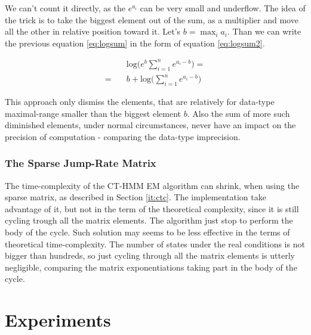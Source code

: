 \documentclass[thesis=M,english]{FITthesis}[2012/10/20]
\begin{document}
We can't count it directly, as the $e^{a_i}$ can be very small and underflow. The idea of the trick is to take the biggest element out of the sum, as a multiplier and move all the other in relative position toward it.
Let's $b = \max_{i} a_i$. Than we can write the previous equation \eqref{eq:logsum} in the form of equation \eqref{eq:logsum2}. 

\begin{equation}\label{eq:logsum2}
\begin{aligned}
&\mathrm{log} \big( e^b \sum_{i=1}^n e^{a_i - b } \big) = \\
 = \quad &  b + \mathrm{log} \big( \sum_{i=1}^n e^{a_i - b } \big)
\end{aligned}
\end{equation}

This approach only dismiss the elements, that are relatively for data-type maximal-range smaller than the biggest element $b$. Also the sum of more such diminished elements, under normal circumstances, never have an impact on the precision of computation - comparing the data-type imprecision.     


\subsection{The Sparse Jump-Rate Matrix}

The time-complexity of the CT-HMM EM algorithm can shrink, when using the sparse matrix, as described in Section \ref{it:ctc}. The implementation take advantage of it, but not in the term of the theoretical complexity, since it is still cycling trough all the matrix elements. The algorithm just stop to perform the body of the cycle. Such solution may seems to be less effective in the terms of theoretical time-complexity. The number of states under the real conditions is not bigger than hundreds, so just cycling through all the matrix elements is utterly negligible, comparing the matrix exponentiations taking part in the body of the cycle.  
 
\chapter{Experiments}\label{ch:e}
\end{document}
